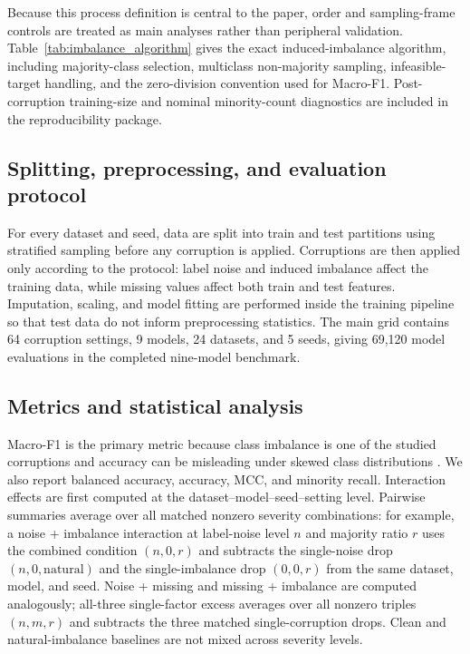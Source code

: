 \documentclass[preprint,12pt,number]{elsarticle}
\begin{document}
Because this process definition is central to the paper, order and sampling-frame controls are treated as main analyses rather than peripheral validation. Table~\ref{tab:imbalance_algorithm} gives the exact induced-imbalance algorithm, including majority-class selection, multiclass non-majority sampling, infeasible-target handling, and the zero-division convention used for Macro-F1. Post-corruption training-size and nominal minority-count diagnostics are included in the reproducibility package.



\subsection{Splitting, preprocessing, and evaluation protocol}

For every dataset and seed, data are split into train and test partitions using stratified sampling before any corruption is applied. Corruptions are then applied only according to the protocol: label noise and induced imbalance affect the training data, while missing values affect both train and test features. Imputation, scaling, and model fitting are performed inside the training pipeline so that test data do not inform preprocessing statistics. The main grid contains 64 corruption settings, 9 models, 24 datasets, and 5 seeds, giving 69,120 model evaluations in the completed nine-model benchmark.

\subsection{Metrics and statistical analysis}

Macro-F1 is the primary metric because class imbalance is one of the studied corruptions and accuracy can be misleading under skewed class distributions \citep{he2009learning,johnson2019survey}. We also report balanced accuracy, accuracy, MCC, and minority recall. Interaction effects are first computed at the dataset--model--seed--setting level. Pairwise summaries average over all matched nonzero severity combinations: for example, a noise + imbalance interaction at label-noise level $n$ and majority ratio $r$ uses the combined condition $(n,0,r)$ and subtracts the single-noise drop $(n,0,\mathrm{natural})$ and the single-imbalance drop $(0,0,r)$ from the same dataset, model, and seed. Noise + missing and missing + imbalance are computed analogously; all-three single-factor excess averages over all nonzero triples $(n,m,r)$ and subtracts the three matched single-corruption drops. Clean and natural-imbalance baselines are not mixed across severity levels.
\end{document}
